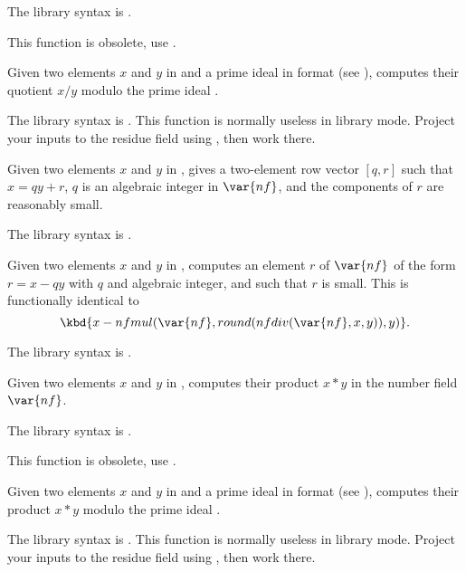 The library syntax is .

\label{se:nfeltdivmodpr}
This function is obsolete, use .

Given two elements $x$
and $y$ in  and  a prime ideal in  format (see
), computes their quotient $x / y$ modulo the prime ideal
.

The library syntax is .
This function is normally useless in library mode. Project your
inputs to the residue field using , then work there.

\label{se:nfeltdivrem}
Given two elements $x$ and $y$ in
, gives a two-element row vector $[q,r]$ such that $x=qy+r$, $q$ is
an algebraic integer in $\var{nf}$, and the components of $r$ are
reasonably small.

The library syntax is .

\label{se:nfeltmod}
Given two elements $x$ and $y$ in
, computes an element $r$ of $\var{nf}$ of the form $r=x-qy$ with
$q$ and algebraic integer, and such that $r$ is small. This is functionally
identical to
$$\kbd{x - nfmul(\var{nf},round(nfdiv(\var{nf},x,y)),y)}.$$

The library syntax is .

\label{se:nfeltmul}
Given two elements $x$ and $y$ in
, computes their product $x*y$ in the number field $\var{nf}$.

The library syntax is .

\label{se:nfeltmulmodpr}
This function is obsolete, use .

Given two elements $x$ and
$y$ in  and  a prime ideal in  format (see
), computes their product $x*y$ modulo the prime ideal
.

The library syntax is .
This function is normally useless in library mode. Project your
inputs to the residue field using , then work there.


